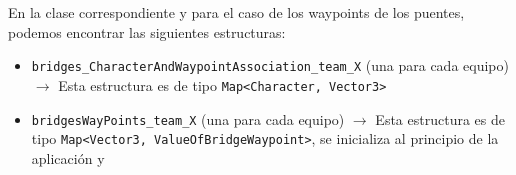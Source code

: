 En la clase correspondiente y para el caso de los waypoints de los puentes, podemos encontrar las siguientes estructuras:
\begin{itemize}
	\item \texttt{bridges_CharacterAndWaypointAssociation_team_X} (una para cada equipo) $\rightarrow$ Esta estructura es de tipo \texttt{Map<Character, Vector3>}
	\item \texttt{bridgesWayPoints_team_X} (una para cada equipo) $\rightarrow$ Esta estructura es de tipo \texttt{Map<Vector3, ValueOfBridgeWaypoint>}, se inicializa al principio de la aplicación y 
\end{itemize}

